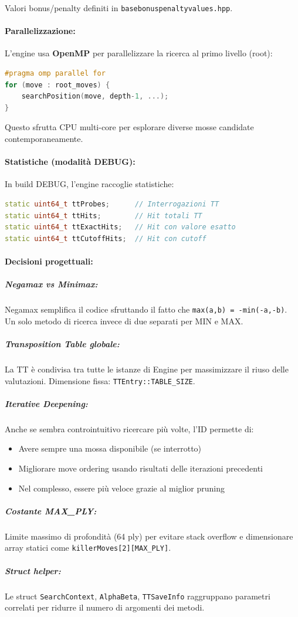 Valori bonus/penalty definiti in \texttt{basebonuspenaltyvalues.hpp}.

\paragraph{Parallelizzazione:}

L'engine usa \textbf{OpenMP} per parallelizzare la ricerca al primo livello (root):
\begin{lstlisting}[language=C++]
#pragma omp parallel for
for (move : root_moves) {
    searchPosition(move, depth-1, ...);
}
\end{lstlisting}

Questo sfrutta CPU multi-core per esplorare diverse mosse candidate contemporaneamente.

\paragraph{Statistiche (modalità DEBUG):}

In build DEBUG, l'engine raccoglie statistiche:
\begin{lstlisting}[language=C++]
static uint64_t ttProbes;      // Interrogazioni TT
static uint64_t ttHits;        // Hit totali TT
static uint64_t ttExactHits;   // Hit con valore esatto
static uint64_t ttCutoffHits;  // Hit con cutoff
\end{lstlisting}

\paragraph{Decisioni progettuali:}

\subparagraph{Negamax vs Minimax:}
Negamax semplifica il codice sfruttando il fatto che \texttt{max(a,b) = -min(-a,-b)}.
Un solo metodo di ricerca invece di due separati per MIN e MAX.

\subparagraph{Transposition Table globale:}
La TT è condivisa tra tutte le istanze di Engine per massimizzare il riuso delle valutazioni.
Dimensione fissa: \texttt{TTEntry::TABLE\_SIZE}.

\subparagraph{Iterative Deepening:}
Anche se sembra controintuitivo ricercare più volte, l'ID permette di:
\begin{itemize}
  \item Avere sempre una mossa disponibile (se interrotto)
  \item Migliorare move ordering usando risultati delle iterazioni precedenti
  \item Nel complesso, essere più veloce grazie al miglior pruning
\end{itemize}

\subparagraph{Costante MAX\_PLY:}
Limite massimo di profondità (64 ply) per evitare stack overflow e dimensionare array statici
come \texttt{killerMoves[2][MAX\_PLY]}.

\subparagraph{Struct helper:}
Le struct \texttt{SearchContext}, \texttt{AlphaBeta}, \texttt{TTSaveInfo} raggruppano
parametri correlati per ridurre il numero di argomenti dei metodi.
